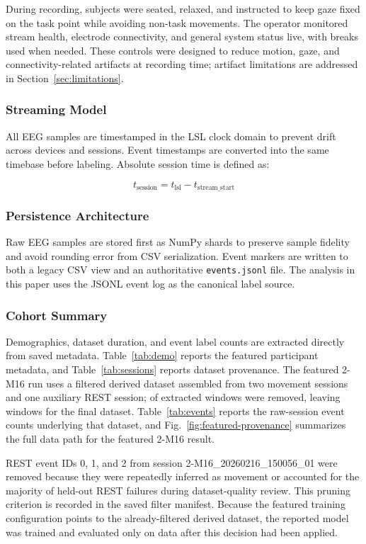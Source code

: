 \documentclass[conference]{IEEEtran}
\begin{document}
During recording, subjects were seated, relaxed, and instructed to keep gaze fixed on the task point while avoiding non-task movements. The operator monitored stream health, electrode connectivity, and general system status live, with breaks used when needed. These controls were designed to reduce motion, gaze, and connectivity-related artifacts at recording time; artifact limitations are addressed in Section~\ref{sec:limitations}.

\subsubsection{Streaming Model}

All EEG samples are timestamped in the LSL clock domain \cite{Kothe2025LSL} to prevent drift across devices and sessions. Event timestamps are converted into the same timebase before labeling. Absolute session time is defined as:

\[
t_{\text{session}} = t_{\text{lsl}} - t_{\text{stream\_start}}
\]

\subsubsection{Persistence Architecture}

Raw EEG samples are stored first as NumPy shards to preserve sample fidelity and avoid rounding error from CSV serialization. Event markers are written to both a legacy CSV view and an authoritative \texttt{events.jsonl} file. The analysis in this paper uses the JSONL event log as the canonical label source.

\subsubsection{Cohort Summary}
Demographics, dataset duration, and event label counts are extracted directly from saved metadata. Table~\ref{tab:demo} reports the featured participant metadata, and Table~\ref{tab:sessions} reports dataset provenance. The featured 2-M16 run uses a filtered derived dataset assembled from two movement sessions and one auxiliary REST session; \FeaturedDerivedRemovedN{} of \FeaturedDerivedSourceN{} extracted windows were removed, leaving \FeaturedDerivedKeptN{} windows for the final dataset. Table~\ref{tab:events} reports the raw-session event counts underlying that dataset, and Fig.~\ref{fig:featured-provenance} summarizes the full data path for the featured 2-M16 result.

REST event IDs 0, 1, and 2 from session 2-M16\_20260216\_150056\_01 were removed because they were repeatedly inferred as movement or accounted for the majority of held-out REST failures during dataset-quality review. This pruning criterion is recorded in the saved filter manifest. Because the featured training configuration points to the already-filtered derived dataset, the reported model was trained and evaluated only on data after this decision had been applied.
\end{document}
